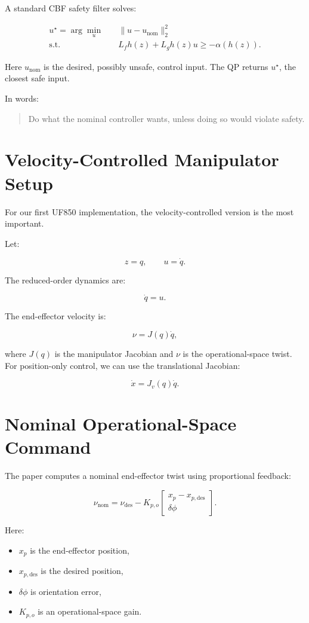 \documentclass[11pt]{article}
\begin{document}
A standard CBF safety filter solves:

\[
\begin{aligned}
u^\star
= \arg\min_u \quad & \|u - u_{\mathrm{nom}}\|_2^2 \\
\text{s.t.} \quad
& L_f h(z) + L_g h(z)u \ge -\alpha(h(z)).
\end{aligned}
\]

Here $u_{\mathrm{nom}}$ is the desired, possibly unsafe, control input. The QP
returns $u^\star$, the closest safe input.

In words:

\begin{quote}
Do what the nominal controller wants, unless doing so would violate safety.
\end{quote}

\section{Velocity-Controlled Manipulator Setup}

For our first UF850 implementation, the velocity-controlled version is the most
important.

Let:

\[
z = q,
\qquad
u = \dot{q}.
\]

The reduced-order dynamics are:

\[
\dot{q} = u.
\]

The end-effector velocity is:

\[
\nu = J(q)\dot{q},
\]

where $J(q)$ is the manipulator Jacobian and $\nu$ is the operational-space
twist. For position-only control, we can use the translational Jacobian:

\[
\dot{x} = J_v(q)\dot{q}.
\]

\section{Nominal Operational-Space Command}

The paper computes a nominal end-effector twist using proportional feedback:

\[
\nu_{\mathrm{nom}}
= \nu_{\mathrm{des}}
- K_{p,o}
\begin{bmatrix}
x_p - x_{p,\mathrm{des}} \\
\delta \phi
\end{bmatrix}.
\]

Here:

\begin{itemize}[leftmargin=*]
    \item $x_p$ is the end-effector position,
    \item $x_{p,\mathrm{des}}$ is the desired position,
    \item $\delta \phi$ is orientation error,
    \item $K_{p,o}$ is an operational-space gain.
\end{itemize}
\end{document}
